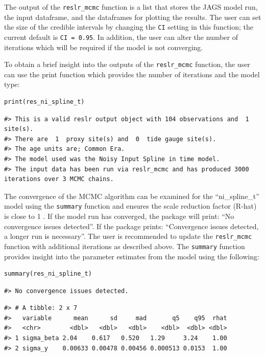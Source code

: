 \normalsize

The output of the \texttt{reslr\_mcmc} function is a list that stores the JAGS model run, the input dataframe, and the dataframes for plotting the results. The user can set the size of the credible intervals by changing the \texttt{CI} setting in this function; the current default is \texttt{CI\ =\ 0.95}. In addition, the user can alter the number of iterations which will be required if the model is not converging.

To obtain a brief insight into the outputs of the \texttt{reslr\_mcmc} function, the user can use the print function which provides the number of iterations and the model type:
\scriptsize

\begin{verbatim}
print(res_ni_spline_t)
\end{verbatim}

\begin{verbatim}
#> This is a valid reslr output object with 104 observations and  1 site(s).
#> There are  1  proxy site(s) and  0  tide gauge site(s).
#> The age units are; Common Era. 
#> The model used was the Noisy Input Spline in time model.
#> The input data has been run via reslr_mcmc and has produced 3000 iterations over 3 MCMC chains.
\end{verbatim}

\normalsize

The convergence of the MCMC algorithm can be examined for the ``ni\_spline\_t'' model using the \texttt{summary} function and ensures the scale reduction factor (R-hat) is close to 1 \citep{Gelman1992, gelman2013bayesian}. If the model run has converged, the package will print: ``No convergence issues detected''. If the package prints: ``Convergence issues detected, a longer run is necessary''. The user is recommended to update the \texttt{reslr\_mcmc} function with additional iterations as described above. The \texttt{summary} function provides insight into the parameter estimates from the model using the following:
\scriptsize

\begin{verbatim}
summary(res_ni_spline_t)
\end{verbatim}

\begin{verbatim}
#> No convergence issues detected.
\end{verbatim}

\begin{verbatim}
#> # A tibble: 2 x 7
#>   variable      mean      sd     mad       q5    q95  rhat
#>   <chr>        <dbl>   <dbl>   <dbl>    <dbl>  <dbl> <dbl>
#> 1 sigma_beta 2.04    0.617   0.520   1.29     3.24    1.00
#> 2 sigma_y    0.00633 0.00478 0.00456 0.000513 0.0153  1.00
\end{verbatim}

